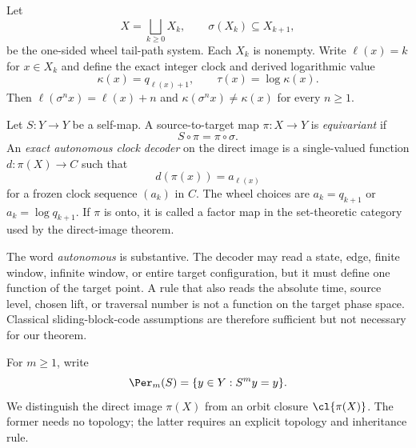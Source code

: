 Let
\begin{equation}
X=\bigsqcup_{k\ge0}X_k,
\qquad
\sigma(X_k)\subseteq X_{k+1},
\label{eq:grading}
\end{equation}
be the one-sided wheel tail-path system.  Each $X_k$ is nonempty.  Write
$\ell(x)=k$ for $x\in X_k$ and define the exact integer clock and derived
logarithmic value
\begin{equation}
\kappa(x)=q_{\ell(x)+1},
\qquad
\tau(x)=\log\kappa(x).
\label{eq:clock}
\end{equation}
Then $\ell(\sigma^n x)=\ell(x)+n$ and
$\kappa(\sigma^n x)\ne\kappa(x)$ for every $n\ge1$.

\begin{definition}
\label{def:decoder}
Let $S:Y\to Y$ be a self-map.  A source-to-target map
$\pi:X\to Y$ is \emph{equivariant} if
\begin{equation}
S\circ\pi=\pi\circ\sigma.
\label{eq:equivariance}
\end{equation}
An \emph{exact autonomous clock decoder} on the direct image is a
single-valued function $d:\pi(X)\to C$ such that
\begin{equation}
d(\pi(x))=a_{\ell(x)}
\label{eq:decoder}
\end{equation}
for a frozen clock sequence $(a_k)$ in $C$.  The wheel choices are
$a_k=q_{k+1}$ or $a_k=\log q_{k+1}$.  If $\pi$ is onto, it is called a
factor map in the set-theoretic category used by the direct-image theorem.
\end{definition}

The word \emph{autonomous} is substantive.  The decoder may read a state,
edge, finite window, infinite window, or entire target configuration, but it
must define one function of the target point.  A rule that also reads the
absolute time, source level, chosen lift, or traversal number is not a
function on the target phase space.  Classical sliding-block-code
assumptions are therefore sufficient but not necessary for our theorem.

For $m\ge1$, write
\[
\Per_m(S)=\{y\in Y:S^my=y\}.
\]
We distinguish the direct image $\pi(X)$ from an orbit closure
$\cl{\pi(X)}$.  The former needs no topology; the latter requires an
explicit topology and inheritance rule.
